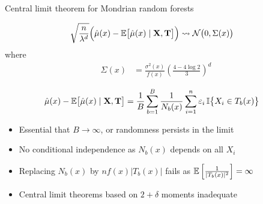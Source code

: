 \documentclass{beamer}
\begin{document}
\begin{frame}{Central limit theorem for Mondrian random forests}

  \vspace*{3mm}
  \begin{beamertheorem}%
    \vspace*{-3mm}
    \begin{align*}
      \sqrt{\frac{n}{\lambda^d}}
      \Big(
        \hat \mu(x)
        - \mathbb{E} \big[ \hat \mu(x) \mid \mathbf{X}, \mathbf{T} \big]
      \Big)
      &\rightsquigarrow
      \mathcal{N}\big(0, \Sigma(x)\big)
    \end{align*}
    \vspace*{-4mm}
    where
    \vspace*{-4mm}
    \begin{align*}
      \Sigma(x)
      &=
      \frac{\sigma^2(x)}{f(x)}
      \left(
        \frac{4 - 4 \log 2}{3 }
      \right)^d
    \end{align*}
    \vspace*{-4mm}
  \end{beamertheorem}

  \vspace*{-7mm}
  \begin{align*}
    \hat \mu(x)
    - \mathbb{E} \big[ \hat \mu(x) \mid \mathbf{X}, \mathbf{T} \big]
    &=
    \frac{1}{B} \sum_{b=1}^B
    \frac{1}{N_b(x)}
    \sum_{i=1}^n \varepsilon_i \,
    \mathbb{I}\big\{ X_i \in T_b(x) \big\}
  \end{align*}

  \vspace*{-1mm}
  \begin{itemize}
    \item
      Essential that $B \to \infty$, or randomness persists in the limit
    \item
      No conditional independence as $N_b(x)$ depends on all $X_i$
    \item
      Replacing $N_b(x)$ by $n f(x) |T_b(x)|$ fails
      as $\mathbb{E} \left[ \frac{1}{|T_b(x)|^2} \right] = \infty$
    \item
      Central limit theorems based on $2+\delta$ moments inadequate

  \end{itemize}

\end{frame}
\end{document}
